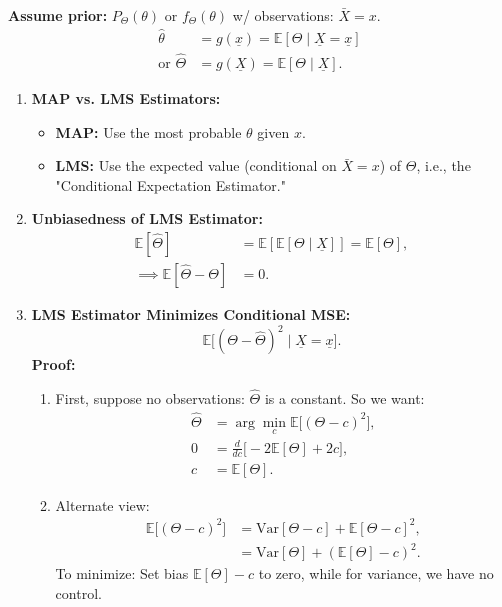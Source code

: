 
\begin{definition}
    \textbf{Assume prior:} $P_\Theta(\theta) \text{ or } f_\Theta(\theta)$ w/ observations: \( \bar{X} = x \).
    \begin{align*}
        \hat{\theta} &= g(\underline{x}) = \mathbb{E}[\Theta \mid \underline{X} = \underline{x}] \\
        \text{or } \hat{\Theta} &= g(\underline{X}) = \mathbb{E}[\Theta \mid \underline{X} ].
    \end{align*}
\end{definition}

\begin{notes}
    \begin{enumerate}
    \item \textbf{MAP vs. LMS Estimators:}
    \begin{itemize}
        \item \textbf{MAP:} Use the most probable \( \theta \) given \( x \).
        \item \textbf{LMS:} Use the expected value (conditional on \( \bar{X} = x \)) of \( \Theta \), i.e., the "Conditional Expectation Estimator."
    \end{itemize}

    \item \textbf{Unbiasedness of LMS Estimator:}
    \begin{align*}
        \mathbb{E}[\hat{\Theta}] &= \mathbb{E}[\mathbb{E}[\Theta \mid \underline{X}]] = \mathbb{E}[\Theta], \\
        \implies \mathbb{E}[\hat{\Theta} - \Theta] &= 0.
    \end{align*}

    \item \textbf{LMS Estimator Minimizes Conditional MSE:}
    \[
    \mathbb{E}\big[(\Theta - \hat{\Theta})^2 \mid \underline{X} = \underline{x} \big].
    \]
    \textbf{Proof:}
    \begin{enumerate}
        \item First, suppose no observations: \( \hat{\Theta} \) is a constant. So we want:
        \begin{align*}
            \hat{\Theta} &= \arg\min_c \mathbb{E}\big[(\Theta - c)^2\big], \\
            0 &= \frac{d}{dc} \big[ -2\mathbb{E}[\Theta] + 2c \big], \\
            c &= \mathbb{E}[\Theta].
        \end{align*}

        \item Alternate view:
        \begin{align*}
            \mathbb{E}\big[(\Theta - c)^2\big] &= \mathrm{Var}[\Theta - c] + \mathbb{E}[\Theta - c]^2, \\
            &= \mathrm{Var}[\Theta] + (\mathbb{E}[\Theta] - c)^2.
        \end{align*}
        To minimize: Set bias \( \mathbb{E}[\Theta] - c \) to zero, while for variance, we have no control.


\end{enumerate}
\end{enumerate}
\end{notes}
